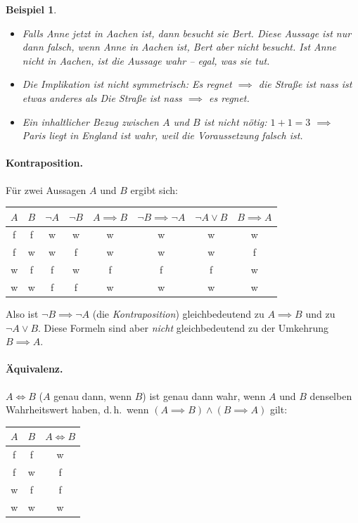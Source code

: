 \documentclass[a4paper]{article}
\theoremstyle{kurzskript}
\newtheorem*{bsp}{Beispiel}
\newcommand{\w}{\textsf{w}}   %
\newcommand{\f}{\textsf{f}}   %
\begin{document}
\begin{bsp}
\leavevmode
\begin{itemize}
  \item \glqq Falls Anne jetzt in Aachen ist, dann besucht sie Bert.\grqq{} Diese Aussage ist nur dann falsch, wenn Anne in Aachen ist, Bert aber nicht besucht. Ist Anne nicht in Aachen, ist die Aussage wahr -- egal, was sie tut.
  \item Die Implikation ist \emph{nicht symmetrisch}: \glqq Es regnet $\implies$ die Straße ist nass\grqq{} ist etwas anderes als \glqq Die Straße ist nass $\implies$ es regnet\grqq.
  \item Ein inhaltlicher Bezug zwischen $A$ und $B$ ist nicht nötig: \glqq$1 + 1 = 3$\grqq{} $\implies$ \glqq Paris liegt in England\grqq{} ist wahr, weil die Voraussetzung falsch ist.
\end{itemize}
\end{bsp}

\paragraph{Kontraposition.}
Für zwei Aussagen $A$ und $B$ ergibt sich:
\begin{center}
\begin{tabular}{cc|cc|c|c|c|c}
$A$ & $B$ & $\neg A$ & $\neg B$ & $A \implies B$ & $\neg B \implies \neg A$ & $\neg A \lor B$ & $B \implies A$\\\hline
\f & \f & \w & \w & \w & \w & \w & \w\\
\f & \w & \w & \f & \w & \w & \w & \f\\
\w & \f & \f & \w & \f & \f & \f & \w\\
\w & \w & \f & \f & \w & \w & \w & \w
\end{tabular}
\end{center}
Also ist $\neg B \implies \neg A$ (die \emph{Kontraposition}) gleichbedeutend zu $A \implies B$ und zu $\neg A \lor B$. Diese Formeln sind aber \emph{nicht} gleichbedeutend zu der Umkehrung $B \implies A$.

\paragraph{Äquivalenz.}
$A \iff B$ (\glqq $A$ genau dann, wenn $B$\grqq) ist genau dann wahr, wenn $A$ und $B$ denselben Wahrheitswert haben, d.\,h.\ wenn $(A \implies B) \land (B \implies A)$ gilt:
\begin{center}
\begin{tabular}{cc|c}
$A$ & $B$ & $A \iff B$\\\hline
\f & \f & \w\\
\f & \w & \f\\
\w & \f & \f\\
\w & \w & \w
\end{tabular}
\end{center}
\end{document}
